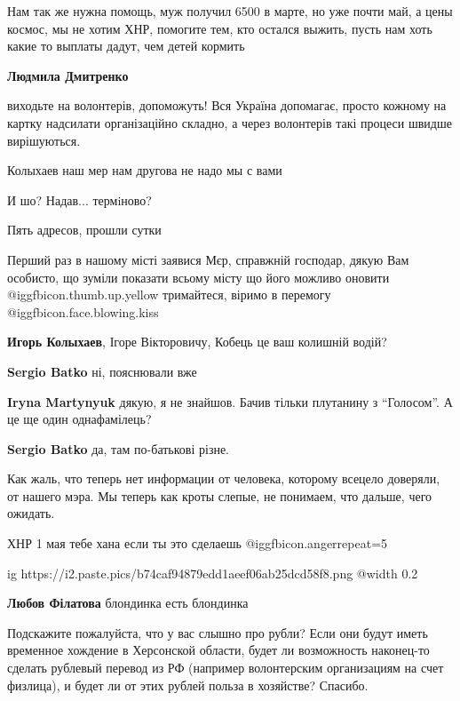 \begin{itemize}
Нам так же нужна помощь, муж получил 6500 в марте, но уже почти май, а цены
космос, мы не хотим ХНР, помогите тем, кто остался выжить, пусть нам хоть какие
то выплаты дадут, чем детей кормить

\textbf{Людмила Дмитренко} 

виходьте на волонтерів, допоможуть! Вся Україна допомагає, просто кожному на
картку надсилати організаційно складно, а через волонтерів такі процеси швидше
вирішуються.

Колыхаев наш мер нам другова не надо мы с вами

И шо? Надав... термiново?

Пять адресов, прошли сутки


Перший раз в нашому місті заявися Мєр, справжній господар, дякую Вам особисто,
що зуміли показати всьому місту що його можливо оновити @igg{fbicon.thumb.up.yellow}  тримайтеся, віримо в
перемогу @igg{fbicon.face.blowing.kiss} 

\textbf{Игорь Колыхаев}, Ігоре Вікторовичу, Кобець це ваш колишній водій?

\begin{itemize} %
\textbf{Sergio Batko} ні, пояснювали вже

\textbf{Iryna Martynyuk} дякую, я не знайшов. Бачив тільки плутанину з \enquote{Голосом}. А це ще один однафамілець?

\textbf{Sergio Batko} да, там по-батькові різне.
\end{itemize} %


Как жаль, что теперь нет информации от человека, которому всецело доверяли, от
нашего мэра. Мы теперь как кроты слепые, не понимаем, что дальше, чего ожидать.

ХНР 1 мая тебе хана если ты это сделаешь  @igg{fbicon.anger}{repeat=5} 

\ifcmt
  ig https://i2.paste.pics/b74caf94879edd1aeef06ab25dcd58f8.png
  @width 0.2
\fi

\textbf{Любов Філатова} блондинка есть блондинка


Подскажите пожалуйста, что у вас слышно про рубли? Если они будут иметь
временное хождение в Херсонской области, будет ли возможность наконец-то
сделать рублевый перевод из РФ (например волонтерским организациям на счет
физлица), и будет ли от этих рублей польза в хозяйстве? Спасибо.


\end{itemize}

